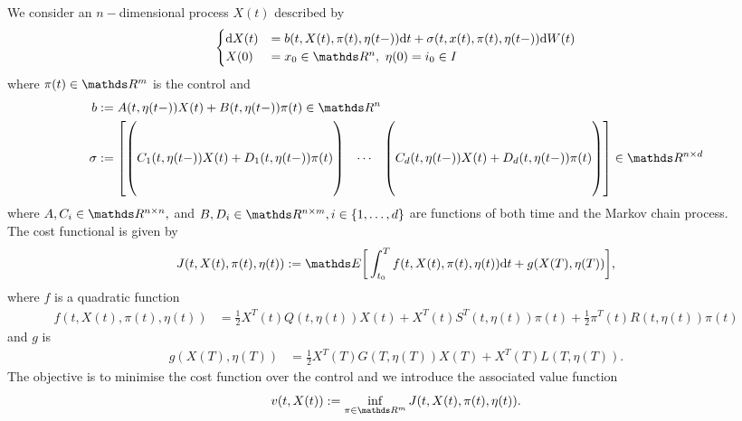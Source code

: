 We consider an $n-$dimensional process $X(t)$ described by
\begin{equation}
    \begin{cases}
        \d X(t) &= b(t, X(t),\pi(t), \eta(t-)) \d t + \sigma(t, x(t), \pi(t), \eta(t-)) \d W(t)\\
         X(0) &= x_0 \in \R^n, \, \, \eta(0) = i_0 \in I
    \end{cases}
\end{equation}
where $\pi(t) \in \R^m$ is the control and
\begin{align*}
    b&:= A(t, \eta(t-)) X(t) + B(t, \eta(t-)) \pi (t) \in \R^{n}\\
    \sigma &:= 
    \begin{bmatrix}
        \begin{pmatrix}
            \\
            \\
            C_1(t, \eta(t-)) X(t) + D_1(t, \eta(t-)) \pi(t)\\
            \\
            \\
        \end{pmatrix} 
        & \cdots & 
        \begin{pmatrix}
            \\
            \\
            C_d(t, \eta(t-)) X(t) + D_d(t, \eta(t-)) \pi(t)\\
            \\
            \\
        \end{pmatrix}
    \end{bmatrix}
    \in \R^{n \times d}
\end{align*}
where $A, C_i \in \R^{n \times n},$ and $B, D_i \in \R^{n \times m}, i \in \{1, \dots, d \}$ are functions of both time and the Markov chain process.\\

The cost functional is given by
\begin{equation}
    J(t, X(t), \pi(t), \eta(t)) := \E \bigg[ \int_{t_0}^T f(t, X(t), \pi(t), \eta(t)) \d t + g(X(T), \eta(T))\bigg],
\end{equation}
where $f$ is a quadratic function
\begin{align*}
    f(t, X(t), \pi(t), \eta(t)) &= \frac{1}{2} X^T(t) Q(t, \eta(t)) X(t) + X^T(t) S^T(t, \eta(t)) \pi(t) + \frac{1}{2}\pi^T(t) R(t, \eta(t)) \pi(t)
\end{align*}
and $g$ is 
\begin{align*}
    g(X(T), \eta(T)) &= \frac12 X^T(T) G(T, \eta(T)) X(T) + X^T(T) L(T, \eta(T)).
\end{align*}
The objective is to minimise the cost function over the control and we introduce the associated value function
\begin{equation}
    v(t, X(t)) := \inf_{\pi \in \R^m} J(t, X(t), \pi(t), \eta(t)). 
\end{equation}

